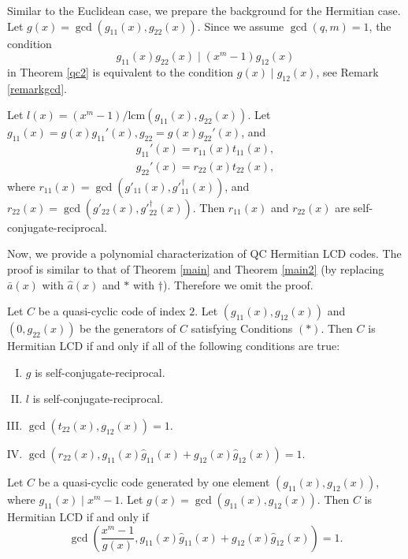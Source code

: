 \documentclass[a4paper,12pt]{article}
\begin{document}
Similar to  the Euclidean case, we prepare the background for the Hermitian case. Let $g(x)= \gcd(g_{11}(x),g_{22}(x))$. Since we assume $\gcd(q,m)=1$, the condition 
$$g_{11}(x)g_{22}(x) \mid (x^m-1)g_{12}(x)$$ 
in Theorem \ref{qc2} is equivalent to the condition $g(x) \mid g_{12}(x)$, see Remark \ref{remarkgcd}. 


Let  $l(x)= (x^m-1)/\text{lcm}(g_{11}(x),g_{22}(x))$. Let $g_{11}(x)=g(x)   g_{11}'(x), g_{22}=g(x) g_{22}'(x)$, and
\begin{align*}
	g_{11}'(x)=r_{11}(x) t_{11}(x),\\
	g_{22}'(x)=r_{22}(x) t_{22}(x),
\end{align*}
where $r_{11}(x)=\gcd(g'_{11}(x), g'^{\dagger}_{11}(x))$, and $r_{22}(x)=\gcd(g'_{22}(x), g'^{\dagger}_{22}(x))$. Then $r_{11}(x)$ and $r_{22}(x)$ are self-conjugate-reciprocal.

Now, we provide a polynomial characterization of QC Hermitian LCD codes. The proof is similar to that of Theorem \ref{main} and Theorem \ref{main2} (by replacing $\bar{a}(x)$ with $\hat{a}(x)$ and $*$ with $\dagger$). Therefore we omit the proof.  

\begin{theorem} \label{qch} Let $C$ be a quasi-cyclic code   of index $2$. Let $(g_{11}(x), g_{12}(x))$ and $(0, g_{22}(x))$ be the generators of $C$ satisfying Conditions $(\ast)$.   
	Then $C$ is Hermitian LCD if and only if all of the following conditions are true:
	\begin{enumerate}[(I)]
		\item  $g$ is self-conjugate-reciprocal.
		\item  $l$ is self-conjugate-reciprocal. 
		\item  $\gcd(t_{22}(x),g_{12}(x))=1$. 
		\item $\gcd(r_{22}(x), g_{11}(x)\hat{g}_{11}(x)+g_{12}(x) \hat{g}_{12}(x))=1$.
	\end{enumerate}
\end{theorem}

\begin{theorem} \label{Hlcd1}  Let $C$ be a quasi-cyclic code generated by one element $(g_{11}(x),g_{12}(x))$, where $g_{11}(x)\mid x^m-1$. Let $g(x)=\gcd(g_{11}(x),g_{12}(x))$. Then $C$ is Hermitian LCD if and only if 
	\begin{equation*} 
		\gcd \left(\dfrac{x^m-1}{g(x)},  g_{11}(x)\hat{g}_{11}(x)+g_{12}(x) \hat{g}_{12}(x)\right)=1.
	\end{equation*}
\end{theorem}
\end{document}
